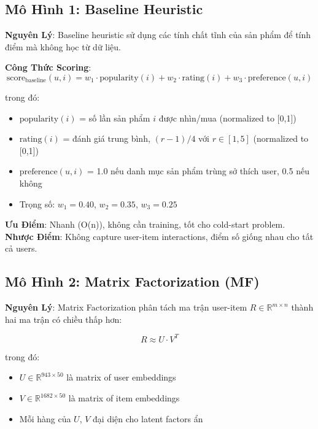 \documentclass[12pt,a4paper]{article}
\begin{document}
\subsection{Mô Hình 1: Baseline Heuristic}

\textbf{Nguyên Lý}: Baseline heuristic sử dụng các tính chất tĩnh của sản phẩm để tính điểm mà không học từ dữ liệu.

\textbf{Công Thức Scoring}:
\begin{equation}
\text{score}_{\text{baseline}}(u, i) = w_1 \cdot \text{popularity}(i) + w_2 \cdot \text{rating}(i) + w_3 \cdot \text{preference}(u, i)
\end{equation}

trong đó:
\begin{itemize}
    \item $\text{popularity}(i)$ = số lần sản phẩm $i$ được nhìn/mua (normalized to [0,1])
    \item $\text{rating}(i)$ = đánh giá trung bình, $(r - 1) / 4$ với $r \in [1,5]$ (normalized to [0,1])
    \item $\text{preference}(u, i)$ = 1.0 nếu danh mục sản phẩm trùng sở thích user, 0.5 nếu không
    \item Trọng số: $w_1 = 0.40$, $w_2 = 0.35$, $w_3 = 0.25$
\end{itemize}

\textbf{Ưu Điểm}: Nhanh (O(n)), không cần training, tốt cho cold-start problem.
\textbf{Nhược Điểm}: Không capture user-item interactions, điểm số giống nhau cho tất cả users.

\subsection{Mô Hình 2: Matrix Factorization (MF)}

\textbf{Nguyên Lý}: Matrix Factorization phân tách ma trận user-item $R \in \mathbb{R}^{m \times n}$ thành hai ma trận có chiều thấp hơn:

\begin{equation}
R \approx U \cdot V^T
\end{equation}

trong đó:
\begin{itemize}
    \item $U \in \mathbb{R}^{943 \times 50}$ là matrix of user embeddings
    \item $V \in \mathbb{R}^{1682 \times 50}$ là matrix of item embeddings
    \item Mỗi hàng của $U$, $V$ đại diện cho latent factors ẩn
\end{itemize}
\end{document}

